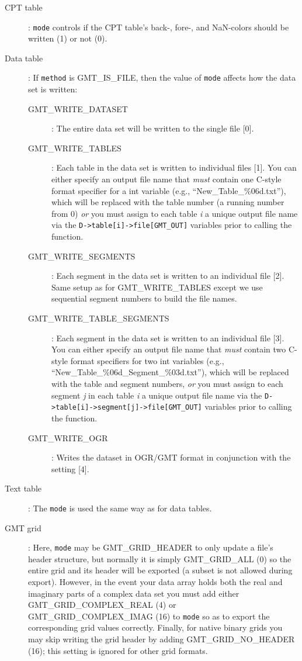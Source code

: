 \documentclass[11pt]{report}
\begin{document}
\begin{description}
\item [CPT table]: \texttt{mode} controls if the CPT table's back-, fore-, and NaN-colors
should be written (1) or not (0).
\item [Data table]: If \texttt{method} is GMT\_IS\_FILE, then the value of
\texttt{mode} affects how the data set is written:
\begin{description}
\item [GMT\_WRITE\_DATASET]: The entire data set will be written to the single file [0].
\item [GMT\_WRITE\_TABLES]: Each table in the data set is written to individual files [1].
You can either specify an output file name that \emph{must} contain one C-style
format specifier for a int variable (e.g., ``New\_Table\_\%06d.txt''), which will be
replaced with the table number (a running number from 0) \emph{or} you must assign
to each table \emph{i} a unique output file name via the \texttt{D->table[i]->file[GMT\_OUT]}
variables prior to calling the function.
\item [GMT\_WRITE\_SEGMENTS]: Each segment in the data set is written to an individual file [2].
Same setup as for GMT\_WRITE\_TABLES except we use sequential segment numbers to build the file names.
\item [GMT\_WRITE\_TABLE\_SEGMENTS]: Each segment in the data set is written to an individual file [3].
You can either specify an output file name that \emph{must} contain two C-style
format specifiers for two int variables (e.g., ``New\_Table\_\%06d\_Segment\_\%03d.txt''),
which will be replaced with the table and segment numbers, \emph{or}
you must assign to each segment \emph{j} in each table \emph{i} a unique output file name
via the \texttt{D->table[i]->segment[j]->file[GMT\_OUT]} variables prior to calling the function.
\item [GMT\_WRITE\_OGR]: Writes the dataset in OGR/GMT format in conjunction with the  setting [4].
\end{description}
\item [Text table]: The \texttt{mode} is used the same way as for data tables.
\item [GMT grid]: Here, \texttt{mode} may be GMT\_GRID\_HEADER to only update a file's header
structure, but normally it is simply GMT\_GRID\_ALL (0) so the entire
grid and its header will be exported (a subset is not allowed during export).
However, in the event your data array holds both the real and imaginary parts of a
complex data set you must add either GMT\_GRID\_COMPLEX\_REAL (4) or GMT\_GRID\_COMPLEX\_IMAG (16) to \texttt{mode}
so as to export the corresponding grid values correctly.  Finally, for native binary grids you may skip writing
the grid header by adding GMT\_GRID\_NO\_HEADER (16); this setting is ignored for other grid formats.
\end{description}
\end{document}
